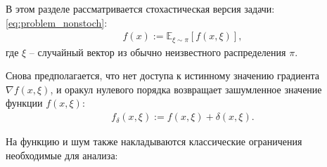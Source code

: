     В этом разделе рассматривается стохастическая версия задачи: \eqref{eq:problem_nonstoch}:
    \begin{align} \label{eq:problem_stoch}
        f(x) := \mathbb{E}_{\xi \sim \pi} \left[ f(x, \xi) \right],
    \end{align}
    где $\xi$ -- случайный вектор из обычно неизвестного распределения $\pi$.
    
    Снова предполагается, что нет доступа к истинному значению градиента $\nabla f(x, \xi)$, и оракул нулевого порядка возвращает зашумленное значение функции $f(x, \xi)$:
    \begin{align*}
        f_\delta (x, \xi) := f(x, \xi) + \delta(x, \xi).
    \end{align*}

    На функцию и шум также накладываются классические ограничения необходимые для анализа:
